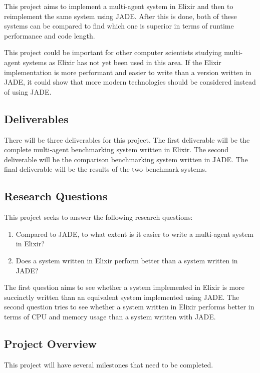 This project aims to implement a multi-agent system in Elixir and then to reimplement the same system using JADE\@.
After this is done, both of these systems can be compared to find which one is superior in terms of runtime performance and code length.

This project could be important for other computer scientists studying multi-agent systems as Elixir has not yet been used in this area.
If the Elixir implementation is more performant and easier to write than a version written in JADE, it could show that more modern technologies should be considered instead of using JADE\@.

\subsection{Deliverables}

There will be three deliverables for this project.
The first deliverable will be the complete multi-agent benchmarking system written in Elixir.
The second deliverable will be the comparison benchmarking system written in JADE\@.
The final deliverable will be the results of the two benchmark systems.

\subsection{Research Questions}\label{sec:research_questions}

This project seeks to answer the following research questions:

\begin{enumerate}
    \item Compared to JADE, to what extent is it easier to write a multi-agent system in Elixir?
    \item Does a system written in Elixir perform better than a system written in JADE\@?
\end{enumerate}

The first question aims to see whether a system implemented in Elixir is more succinctly written than an equivalent system implemented using JADE\@.
The second question tries to see whether a system written in Elixir performs better in terms of CPU and memory usage than a system written with JADE\@.

\subsection{Project Overview}

This project will have several milestones that need to be completed.

